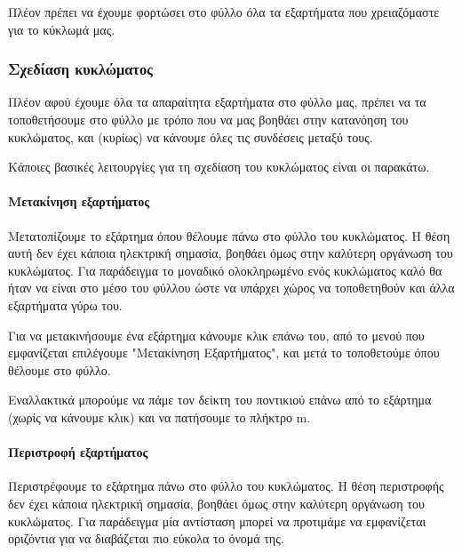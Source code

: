 \documentclass[a4paper]{article}
\begin{document}
Πλέον πρέπει να έχουμε φορτώσει στο φύλλο όλα τα εξαρτήματα που χρειαζόμαστε για το κύκλωμά μας.

\begin{figure}
  \begin{center}
    \label{fig:kicad-main}
  \end{center}
\end{figure}


\subsubsection{Σχεδίαση κυκλώματος}

Πλέον αφού έχουμε όλα τα απαραίτητα εξαρτήματα στο φύλλο μας, πρέπει να τα τοποθετήσουμε στο φύλλο με τρόπο που να μας βοηθάει στην κατανόηση του κυκλώματος, και (κυρίως) να κάνουμε όλες τις συνδέσεις μεταξύ τους.

Κάποιες βασικές λειτουργίες για τη σχεδίαση του κυκλώματος είναι οι παρακάτω.

\paragraph{Μετακίνηση εξαρτήματος}
Μετατοπίζουμε το εξάρτημα όπου θέλουμε πάνω στο φύλλο του κυκλώματος. Η θέση αυτή δεν έχει κάποια ηλεκτρική σημασία, βοηθάει όμως στην καλύτερη οργάνωση του κυκλώματος. Για παράδειγμα το μοναδικό ολοκληρωμένο ενός κυκλώματος καλό θα ήταν να είναι στο μέσο του φύλλου ώστε να υπάρχει χώρος να τοποθετηθούν και άλλα εξαρτήματα γύρω του.

Για να μετακινήσουμε ένα εξάρτημα κάνουμε κλικ επάνω του, από το μενού που εμφανίζεται επιλέγουμε "Μετακίνηση Εξαρτήματος", και μετά το τοποθετούμε όπου θέλουμε στο φύλλο. 

Εναλλακτικά μπορούμε να πάμε τον δείκτη του ποντικιού επάνω από το εξάρτημα (χωρίς να κάνουμε κλικ) και να πατήσουμε το πλήκτρο m.

\paragraph{Περιστροφή εξαρτήματος}
Περιστρέφουμε το εξάρτημα πάνω στο φύλλο του κυκλώματος. Η θέση περιστροφής δεν έχει κάποια ηλεκτρική σημασία, βοηθάει όμως στην καλύτερη οργάνωση του κυκλώματος. Για παράδειγμα μία αντίσταση μπορεί να προτιμάμε να εμφανίζεται οριζόντια για να διαβάζεται πιο εύκολα το όνομά της.
\end{document}
